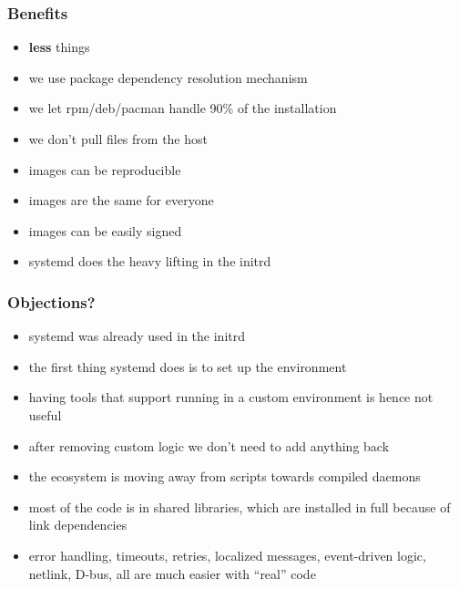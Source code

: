 \documentclass[]{beamer}
\newcommand\pp{}
\begin{document}
\begin{frame}
  \frametitle{Benefits}

  \begin{itemize}
  \item \textbf{less} things
    \pp
  \item we use package dependency resolution mechanism
    \pp
  \item we let rpm/deb/pacman handle 90\% of the installation
    \pp
  \item we don't pull files from the host
    \pp
  \item images can be reproducible
    \pp
  \item images are the same for everyone
    \pp
  \item images can be easily signed
    \pp
  \item systemd does the heavy lifting in the initrd
  \end{itemize}
\end{frame}

\begin{frame}
  \frametitle{Objections?}


  \begin{itemize}
    \pp
    \item 
      systemd was already used in the initrd
    \pp
    \item 
      the first thing systemd does is to set up the environment
    \pp
    \item 
      having tools that support running in a custom environment is hence not useful
    \pp
    \item 
      after removing custom logic we don't need to add anything back
    \pp
    \item 
      the ecosystem is moving away from scripts towards compiled daemons
    \pp
    \item 
      most of the code is in shared libraries, which are installed in full because of link dependencies
    \pp
    \item 
      error handling, timeouts, retries, localized messages, event-driven logic, netlink,
      D-bus, all are much easier with ``real'' code
  \end{itemize}
\end{frame}
\end{document}
